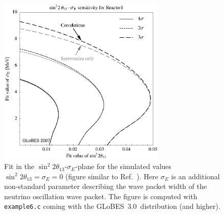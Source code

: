 \documentclass[12pt,a4paper]{article}
\newcommand{\capdef}{}
\newcommand{\mycaption}[2][\capdef]{\renewcommand{\capdef}{#2}%
       \caption[#1]{{\footnotesize #2}}}
\newcommand{\Ref}{Ref.}
\newcommand{\stheta}{\sin^2 2 \theta_{13}}
\newcommand{\GLOBESN}{{\sf GLoBES~3.0}}
\begin{document}
\begin{figure}[t]
\begin{center}
\includegraphics[width=8cm]{reactorNSI}
\end{center}
\mycaption{\label{fig:reactorNSI} Fit in the $\stheta$-$\sigma_E$-plane for the simulated values
$\stheta=\sigma_E=0$ (figure similar to \Ref~\cite{Blennow:2005yk}). Here $\sigma_E$ is an additional non-standard parameter describing the wave packet width of the neutrino oscillation wave packet. The figure is computed with
{\tt example6.c} coming with the \GLOBESN\ distribution (and higher).}
\end{figure}
\end{document}
